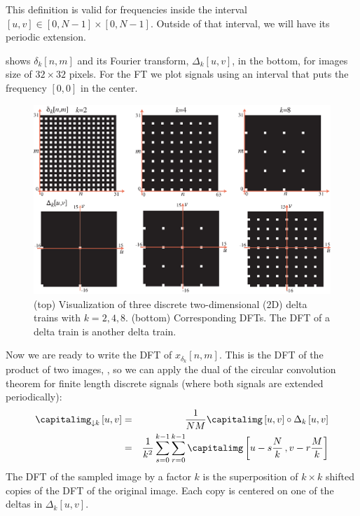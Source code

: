 This definition is valid for frequencies inside the interval $[u,v] \in [0,N-1]\times[0,N-1]$. Outside of that interval, we will have its periodic extension.

\Fig{\ref{fig:discrete_delta_train}} shows $\delta_k \left[n,m\right]$ and its Fourier transform, $\Delta_k \left[u,v\right]$, in the bottom, for images size of $32 \times 32$ pixels. For the FT we  plot signals using an interval that puts the frequency $[0,0]$ in the center.

\begin{figure}[t]
	\centerline{
		\includegraphics[width=1\linewidth]{figures/upsamplig_downsampling/discrete_delta_train.eps}
	}
	\caption{(top) Visualization of three discrete two-dimensional (2D) delta trains with $k=2,4,8$. (bottom) Corresponding DFTs. The DFT of a delta train is another delta train.}
	\label{fig:discrete_delta_train}
\end{figure}


Now we are ready to write the DFT of $x_{\delta_k} \left[n,m\right]$. This is the DFT of the product of two images, \eqn{\ref{eq:down2}}, so we can apply the dual of the circular convolution theorem for finite length discrete signals (where both signals are extended periodically):
\begin{eqnarray}
	\label{eq:decimationFT}
	\capitalimg_{\downarrow k} \left[u,v\right] &=& \frac{1}{NM} \capitalimg \left[u,v\right] \circ \Delta_k \left[u,v\right] \\ \nonumber
	&=& \frac{1}{k^2} \sum_{s=0}^{k-1} \sum_{r=0}^{k-1} \capitalimg \left[u - s\frac{N}{k} \, ,v - r\frac{M}{k} \right]
\end{eqnarray}
The DFT of the sampled image by a factor $k$ is the superposition of $k \times k$ shifted copies of the DFT of the original image. Each copy is centered on one of the deltas in $\Delta_k \left[u,v\right]$.


